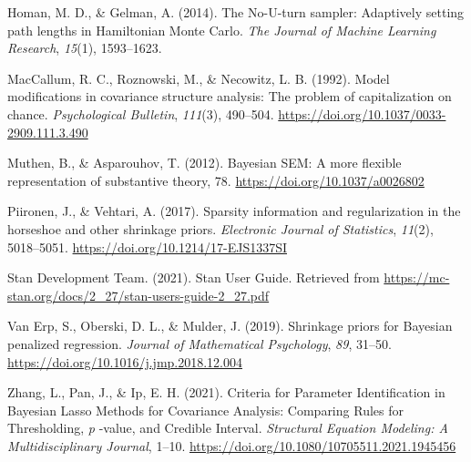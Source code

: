\documentclass[
  man]{apa6}
\newlength{\cslhangindent}
\newlength{\cslentryspacingunit} %
\newenvironment{CSLReferences}[2] %
 {%
  \setlength{\parindent}{0pt}
  \ifodd #1
  \let\oldpar\par
  \def\par{\hangindent=\cslhangindent\oldpar}
  \fi
  \setlength{\parskip}{#2\cslentryspacingunit}
 }%
 {}
\begin{document}
\hypertarget{refs}{}
\begin{CSLReferences}{1}{0}
\leavevmode{}%
Homan, M. D., \& Gelman, A. (2014). The {No}-{U}-turn sampler: Adaptively setting path lengths in {Hamiltonian} {Monte} {Carlo}. \emph{The Journal of Machine Learning Research}, \emph{15}(1), 1593--1623.

\leavevmode{}%
MacCallum, R. C., Roznowski, M., \& Necowitz, L. B. (1992). Model modifications in covariance structure analysis: The problem of capitalization on chance. \emph{Psychological Bulletin}, \emph{111}(3), 490--504. \url{https://doi.org/10.1037/0033-2909.111.3.490}

\leavevmode{}%
Muthen, B., \& Asparouhov, T. (2012). Bayesian {SEM}: {A} more ﬂexible representation of substantive theory, 78. \url{https://doi.org/10.1037/a0026802}

\leavevmode{}%
Piironen, J., \& Vehtari, A. (2017). Sparsity information and regularization in the horseshoe and other shrinkage priors. \emph{Electronic Journal of Statistics}, \emph{11}(2), 5018--5051. \url{https://doi.org/10.1214/17-EJS1337SI}

\leavevmode{}%
Stan Development Team. (2021). Stan {User} {Guide}. Retrieved from \url{https://mc-stan.org/docs/2_27/stan-users-guide-2_27.pdf}

\leavevmode{}%
Van Erp, S., Oberski, D. L., \& Mulder, J. (2019). Shrinkage priors for {Bayesian} penalized regression. \emph{Journal of Mathematical Psychology}, \emph{89}, 31--50. \url{https://doi.org/10.1016/j.jmp.2018.12.004}

\leavevmode{}%
Zhang, L., Pan, J., \& Ip, E. H. (2021). Criteria for {Parameter} {Identification} in {Bayesian} {Lasso} {Methods} for {Covariance} {Analysis}: {Comparing} {Rules} for {Thresholding}, \emph{p} -value, and {Credible} {Interval}. \emph{Structural Equation Modeling: A Multidisciplinary Journal}, 1--10. \url{https://doi.org/10.1080/10705511.2021.1945456}

\end{CSLReferences}

\endgroup

\clearpage
\end{document}
